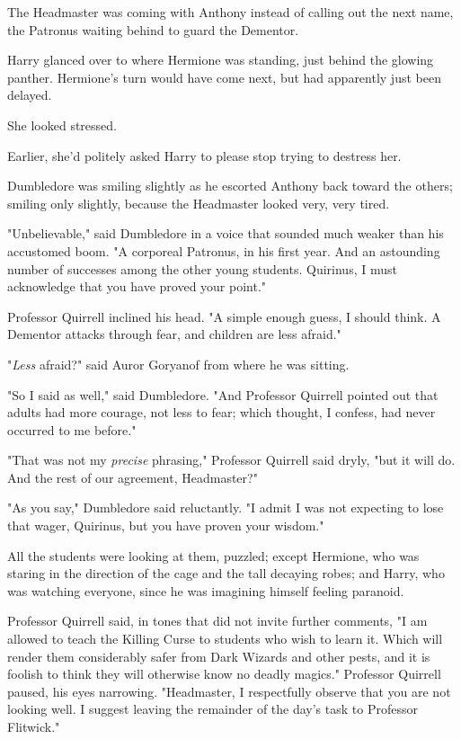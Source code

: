 The Headmaster was coming with Anthony instead of calling out the next name,
the Patronus waiting behind to guard the Dementor.

Harry glanced over to where Hermione was standing, just behind the glowing
panther. Hermione's turn would have come next, but had apparently just been
delayed.

She looked stressed.

Earlier, she'd politely asked Harry to please stop trying to destress her.

Dumbledore was smiling slightly as he escorted Anthony back toward the others;
smiling only slightly, because the Headmaster looked very, very tired.

"Unbelievable," said Dumbledore in a voice that sounded much weaker than his
accustomed boom. "A corporeal Patronus, in his first year. And an astounding
number of successes among the other young students. Quirinus, I must
acknowledge that you have proved your point."

Professor Quirrell inclined his head. "A simple enough guess, I should think. A
Dementor attacks through fear, and children are less afraid."

"\emph{Less} afraid?" said Auror Goryanof from where he was sitting.

"So I said as well," said Dumbledore. "And Professor Quirrell pointed out that
adults had more courage, not less to fear; which thought, I confess, had never
occurred to me before."

"That was not my \emph{precise} phrasing," Professor Quirrell said dryly, "but
it will do. And the rest of our agreement, Headmaster?"

"As you say," Dumbledore said reluctantly. "I admit I was not expecting to lose
that wager, Quirinus, but you have proven your wisdom."

All the students were looking at them, puzzled; except Hermione, who was
staring in the direction of the cage and the tall decaying robes; and Harry,
who was watching everyone, since he was imagining himself feeling paranoid.

Professor Quirrell said, in tones that did not invite further comments, "I am
allowed to teach the Killing Curse to students who wish to learn it. Which will
render them considerably safer from Dark Wizards and other pests, and it is
foolish to think they will otherwise know no deadly magics." Professor Quirrell
paused, his eyes narrowing. "Headmaster, I respectfully observe that you are
not looking well. I suggest leaving the remainder of the day's task to
Professor Flitwick."


